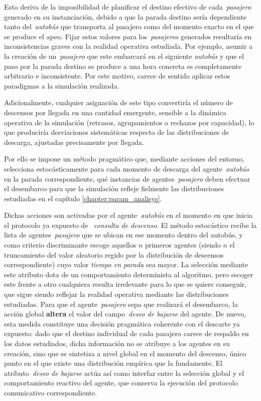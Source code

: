 Esto deriva de la imposibilidad de planificar el destino efectivo de cada~\textit{pasajero} generado en su instanciación,
debido a que la parada destino sería dependiente tanto del~\textit{autobús} que transporta al pasajero como del momento 
exacto en el que se produce el apeo. Fijar estos valores para los~\textit{pasajeros} generados resultaría en inconsistencias 
graves con la realidad operativa estudiada. Por ejemplo, asumir a la creación de un~\textit{pasajero} que este embarcará en 
el siguiente \textit{autobús} y que el paso por la parada destino se produce a una hora concreta es completamente arbitrario e 
inconsistente. Por este motivo, carece de sentido aplicar estos paradigmas a la simulación realizada.

Adicionalmente, cualquier asignación de este tipo convertiría el número de descensos por llegada en una cantidad emergente, 
sensible a la dinámica operativa de la simulación (retrasos, agrupamientos o rechazos por capacidad), lo que produciría 
desviaciones sistemáticas respecto de las distribuciones de descarga, ajustadas precisamente por llegada.

Por ello se impone un método pragmático que, mediante acciones del entorno, selecciona estocásticamente para cada momento
de descarga del agente~\textit{autobús} en la parada correspondiente, qué instancias de agentes~\textit{pasajero} deben 
efectuar el desembarco para que la simulación refleje fielmente las distribuciones estudiadas en el capítulo
\ref{chapter:param_analisys}.

Dichas acciones son activadas por el agente~\textit{autobús} en el momento en que inicia el protocolo ya expuesto de~\textit{
consulta de descenso}. El método estocástico recibe la lista de agentes~\textit{pasajero} que se ubican en ese momento dentro
del autobús, y como criterio discriminante escoge aquellos $n$ primeros agentes (siendo $n$ el truncamiento del valor
aleatorio regido por la distribución de descensos correspondiente) cuyo valor \textit{tiempo en parada}
sea mayor. La selección mediante este atributo dota de un comportamiento determinista al algoritmo, pero escoger este frente
a otro cualquiera resulta
irrelevante para lo que se quiere conseguir, que sigue siendo reflejar la realidad operativa mediante las distribuciones 
estudiadas. Para que el agente~\textit{pasajero} sepa que realizará el desembarco, la acción global \textbf{altera} el valor
del campo~\textit{deseo de bajarse} del agente. De nuevo, esta medida constituye una decisión pragmática coherente con el 
descarte ya expuesto: dado que el destino individual de cada pasajero carece de respaldo en los datos estudiados, dicha 
información no se atribuye a los agentes en su creación, sino que se sintetiza a nivel global en el momento del descenso, 
único punto en el que existe una distribución empírica que la fundamente. El atributo~\textit{deseo de bajarse} actúa así como 
interfaz entre la selección global y el comportamiento reactivo del agente, que conserva la ejecución del protocolo comunicativo
correspondiente.

